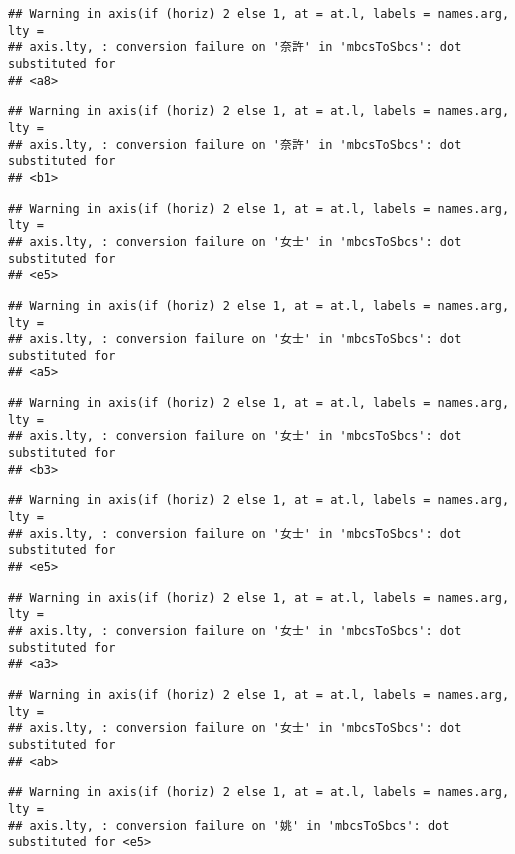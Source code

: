 \documentclass[
]{article}
\begin{document}
\begin{verbatim}
## Warning in axis(if (horiz) 2 else 1, at = at.l, labels = names.arg, lty =
## axis.lty, : conversion failure on '奈許' in 'mbcsToSbcs': dot substituted for
## <a8>
\end{verbatim}

\begin{verbatim}
## Warning in axis(if (horiz) 2 else 1, at = at.l, labels = names.arg, lty =
## axis.lty, : conversion failure on '奈許' in 'mbcsToSbcs': dot substituted for
## <b1>
\end{verbatim}

\begin{verbatim}
## Warning in axis(if (horiz) 2 else 1, at = at.l, labels = names.arg, lty =
## axis.lty, : conversion failure on '女士' in 'mbcsToSbcs': dot substituted for
## <e5>
\end{verbatim}

\begin{verbatim}
## Warning in axis(if (horiz) 2 else 1, at = at.l, labels = names.arg, lty =
## axis.lty, : conversion failure on '女士' in 'mbcsToSbcs': dot substituted for
## <a5>
\end{verbatim}

\begin{verbatim}
## Warning in axis(if (horiz) 2 else 1, at = at.l, labels = names.arg, lty =
## axis.lty, : conversion failure on '女士' in 'mbcsToSbcs': dot substituted for
## <b3>
\end{verbatim}

\begin{verbatim}
## Warning in axis(if (horiz) 2 else 1, at = at.l, labels = names.arg, lty =
## axis.lty, : conversion failure on '女士' in 'mbcsToSbcs': dot substituted for
## <e5>
\end{verbatim}

\begin{verbatim}
## Warning in axis(if (horiz) 2 else 1, at = at.l, labels = names.arg, lty =
## axis.lty, : conversion failure on '女士' in 'mbcsToSbcs': dot substituted for
## <a3>
\end{verbatim}

\begin{verbatim}
## Warning in axis(if (horiz) 2 else 1, at = at.l, labels = names.arg, lty =
## axis.lty, : conversion failure on '女士' in 'mbcsToSbcs': dot substituted for
## <ab>
\end{verbatim}

\begin{verbatim}
## Warning in axis(if (horiz) 2 else 1, at = at.l, labels = names.arg, lty =
## axis.lty, : conversion failure on '姚' in 'mbcsToSbcs': dot substituted for <e5>
\end{verbatim}
\end{document}
